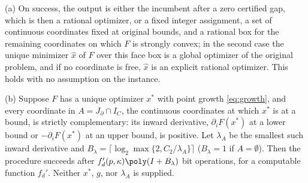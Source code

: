 \begin{theorem}\label{thm:boundary}
(a) On success, the output is either the incumbent after a zero certified
gap, which is then a rational optimizer, or a fixed integer assignment, a set
of continuous coordinates fixed at original bounds, and a rational box for the
remaining coordinates on which $F$ is strongly convex; in the second case the
unique minimizer $\hat x$ of $F$ over this face box is a global optimizer of
the original problem, and if no coordinate is free, $\hat x$ is an explicit
rational optimizer. This holds with no assumption on the instance.

(b) Suppose $F$ has a unique optimizer $x^*$ with point growth
\eqref{eq:growth}, and every coordinate in $A=J_\partial\cap I_C$, the
continuous coordinates at which $x^*$ is at a bound, is strictly complementary:
its inward derivative, $\partial_iF(x^*)$ at a lower bound or
$-\partial_iF(x^*)$ at an upper bound, is positive. Let $\lambda_A$ be the
smallest such inward derivative and
$B_\lambda=\lceil\log_2\max\{2,C_2/\lambda_A\}\rceil$ ($B_\lambda=1$ if
$A=\emptyset$). Then the procedure succeeds after
$f_d'(p,\kappa)\poly(I+B_\lambda)$ bit operations, for a computable function
$f_d'$. Neither $x^*$, $g$, nor $\lambda_A$ is supplied.
\end{theorem}

